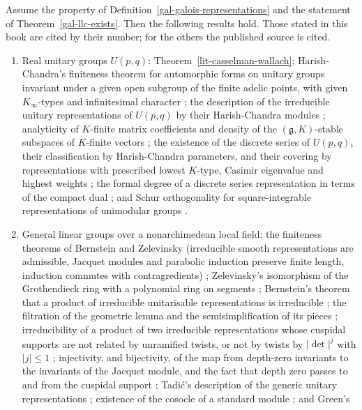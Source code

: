 \begin{theorem}\label{lit-bundle-unitary}
Assume the property of Definition~\ref{gal-galois-representations}
and the statement of Theorem~\ref{gal-llc-exists}. Then the following results
hold. Those stated in this book are cited by their number; for the others the
published source is cited.
\begin{enumerate}
\item Real unitary groups $U(p,q)$: Theorem~\ref{lit-casselman-wallach};
  Harish-Chandra's finiteness theorem for automorphic forms on unitary groups
  invariant under a given open subgroup of the finite adelic points, with
  given $K_\infty$-types and infinitesimal character \cite{HC68}; the
  description of the irreducible unitary representations of $U(p,q)$ by their
  Harish-Chandra modules \cite{HC53}; analyticity of $K$-finite matrix
  coefficients and density of the $(\mathfrak g,K)$-stable subspaces of
  $K$-finite vectors \cite{HC53}; the existence of the discrete series of
  $U(p,q)$, their classification by Harish-Chandra parameters, and their
  covering by representations with prescribed lowest $K$-type, Casimir
  eigenvalue and highest weights \cite{HC65,HC66,Sch75,HS75}; the formal degree of
  a discrete series representation in terms of the compact dual
  \cite{HC66,HII08}; and Schur orthogonality for square-integrable
  representations of unimodular groups \cite[Chapter~14]{Dix77}.
\item General linear groups over a nonarchimedean local field: the finiteness
  theorems of Bernstein and Zelevinsky (irreducible smooth representations are
  admissible, Jacquet modules and parabolic induction preserve finite length,
  induction commutes with contragredients) \cite{BZ76,BZ77}; Zelevinsky's
  isomorphism of the Grothendieck ring with a polynomial ring on segments
  \cite[\S7]{Zel80}; Bernstein's theorem that a product of irreducible
  unitarisable representations is irreducible \cite{Ber84}; the filtration of
  the geometric lemma and the semisimplification of its pieces
  \cite[2.12]{BZ77}; irreducibility of a product of two irreducible
  representations whose cuspidal supports are not related by unramified
  twists, or not by twists by $|\det|^j$ with $|j|\le1$ \cite{BZ77,Zel80};
  injectivity, and bijectivity, of the map from depth-zero invariants to the
  invariants of the Jacquet module, and the fact that depth zero passes to and
  from the cuspidal support \cite{MP94,MP96};
  Tadić's description of the generic unitary representations \cite{Tad86};
  existence of the cosocle of a standard module \cite{Sil78,Zel80}; and Green's

\end{enumerate}
\end{theorem}
